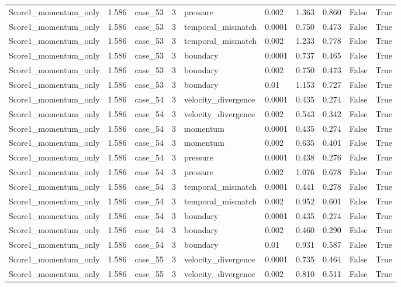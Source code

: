 \begin{longtable}{llllllllll}
Score1\_momentum\_only & 1.586 & case\_53 & 3 & pressure & 0.002 & 1.363 & 0.860 & False & True \\
Score1\_momentum\_only & 1.586 & case\_53 & 3 & temporal\_mismatch & 0.0001 & 0.750 & 0.473 & False & True \\
Score1\_momentum\_only & 1.586 & case\_53 & 3 & temporal\_mismatch & 0.002 & 1.233 & 0.778 & False & True \\
Score1\_momentum\_only & 1.586 & case\_53 & 3 & boundary & 0.0001 & 0.737 & 0.465 & False & True \\
Score1\_momentum\_only & 1.586 & case\_53 & 3 & boundary & 0.002 & 0.750 & 0.473 & False & True \\
Score1\_momentum\_only & 1.586 & case\_53 & 3 & boundary & 0.01 & 1.153 & 0.727 & False & True \\
Score1\_momentum\_only & 1.586 & case\_54 & 3 & velocity\_divergence & 0.0001 & 0.435 & 0.274 & False & True \\
Score1\_momentum\_only & 1.586 & case\_54 & 3 & velocity\_divergence & 0.002 & 0.543 & 0.342 & False & True \\
Score1\_momentum\_only & 1.586 & case\_54 & 3 & momentum & 0.0001 & 0.435 & 0.274 & False & True \\
Score1\_momentum\_only & 1.586 & case\_54 & 3 & momentum & 0.002 & 0.635 & 0.401 & False & True \\
Score1\_momentum\_only & 1.586 & case\_54 & 3 & pressure & 0.0001 & 0.438 & 0.276 & False & True \\
Score1\_momentum\_only & 1.586 & case\_54 & 3 & pressure & 0.002 & 1.076 & 0.678 & False & True \\
Score1\_momentum\_only & 1.586 & case\_54 & 3 & temporal\_mismatch & 0.0001 & 0.441 & 0.278 & False & True \\
Score1\_momentum\_only & 1.586 & case\_54 & 3 & temporal\_mismatch & 0.002 & 0.952 & 0.601 & False & True \\
Score1\_momentum\_only & 1.586 & case\_54 & 3 & boundary & 0.0001 & 0.435 & 0.274 & False & True \\
Score1\_momentum\_only & 1.586 & case\_54 & 3 & boundary & 0.002 & 0.460 & 0.290 & False & True \\
Score1\_momentum\_only & 1.586 & case\_54 & 3 & boundary & 0.01 & 0.931 & 0.587 & False & True \\
Score1\_momentum\_only & 1.586 & case\_55 & 3 & velocity\_divergence & 0.0001 & 0.735 & 0.464 & False & True \\
Score1\_momentum\_only & 1.586 & case\_55 & 3 & velocity\_divergence & 0.002 & 0.810 & 0.511 & False & True \\

\end{longtable}
